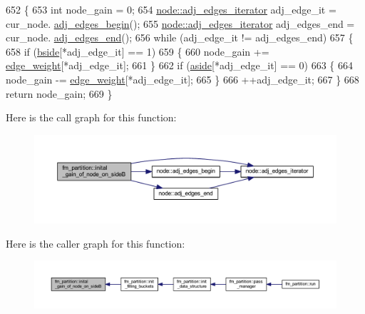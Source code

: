 \begin{DoxyCode}
652 \{
653     \textcolor{keywordtype}{int} node\_gain = 0;
654     \mbox{\hyperlink{classnode_a12cb1a2167f5f03c054de5e707d3156f}{node::adj\_edges\_iterator}} adj\_edge\_it = cur\_node.
      \mbox{\hyperlink{classnode_a788d3e932a5c164caa5ec82aa47551b2}{adj\_edges\_begin}}();
655     \mbox{\hyperlink{classnode_a12cb1a2167f5f03c054de5e707d3156f}{node::adj\_edges\_iterator}} adj\_edges\_end = cur\_node.
      \mbox{\hyperlink{classnode_aa1e7887d29390297580769454f769ad6}{adj\_edges\_end}}();
656     \textcolor{keywordflow}{while} (adj\_edge\_it != adj\_edges\_end)
657     \{
658     \textcolor{keywordflow}{if} (\mbox{\hyperlink{classfm__partition_aa75765887173fb06b076b6cae12d4e66}{bside}}[*adj\_edge\_it] == 1)
659     \{
660         node\_gain += \mbox{\hyperlink{classfm__partition_adfe6147ba3f9c785f613b472f950595f}{edge\_weight}}[*adj\_edge\_it];
661     \}
662     \textcolor{keywordflow}{if} (\mbox{\hyperlink{classfm__partition_a14b0aa9a91a6e7fa3035669cf5056275}{aside}}[*adj\_edge\_it] == 0)
663     \{
664         node\_gain -= \mbox{\hyperlink{classfm__partition_adfe6147ba3f9c785f613b472f950595f}{edge\_weight}}[*adj\_edge\_it];
665     \}
666     ++adj\_edge\_it;
667     \}
668     \textcolor{keywordflow}{return} node\_gain;
669 \}
\end{DoxyCode}
Here is the call graph for this function\+:\nopagebreak
\begin{figure}[H]
\begin{center}
\leavevmode
\includegraphics[width=350pt]{classfm__partition_aa217da6a3c8a736e9e51aa348c951501_cgraph}
\end{center}
\end{figure}
Here is the caller graph for this function\+:\nopagebreak
\begin{figure}[H]
\begin{center}
\leavevmode
\includegraphics[width=350pt]{classfm__partition_aa217da6a3c8a736e9e51aa348c951501_icgraph}
\end{center}
\end{figure}
\mbox{\label{classfm__partition_a91572409b30f0967ea3782079f69b1bb}} 
